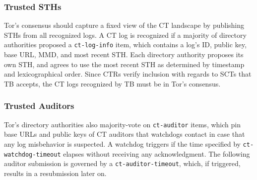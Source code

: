 \subsubsection{Trusted STHs}
Tor's consensus should capture a fixed view of the CT landscape by publishing
STHs from all recognized logs.  A CT log is recognized if a majority of directory
authorities proposed a \texttt{ct-log-info} item, which contains a log's ID,
public key, base URL, MMD, and most recent STH.  Each directory authority
proposes its own STH, and agrees to use the most recent STH as determined by
timestamp and lexicographical order.  Since CTRs verify inclusion with regards
to SCTs that TB accepts, the CT logs recognized by TB must be
in Tor's consensus.

\subsubsection{Trusted Auditors}
Tor's directory authorities also majority-vote on \texttt{ct-auditor} items,
which pin base URLs and public keys of CT auditors that watchdogs contact in
case that any log misbehavior is suspected.  A watchdog triggers if the time
specified by \texttt{ct-watchdog-timeout} elapses without receiving any
acknowledgment.  The following auditor submission is governed by a
\texttt{ct-auditor-timeout}, which, if triggered, results in a resubmission
later on.

